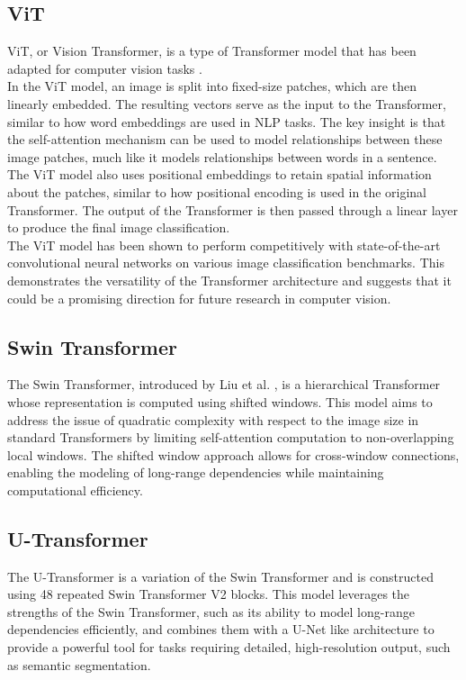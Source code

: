 \subsection{ViT}

ViT, or Vision Transformer, is a type of Transformer model that has been adapted for computer vision tasks \cite{dosovitskiy2021image}. \\

In the ViT model, an image is split into fixed-size patches, which are then linearly embedded. The resulting vectors serve as the input to the Transformer, similar to how word embeddings are used in NLP tasks. The key insight is that the self-attention mechanism can be used to model relationships between these image patches, much like it models relationships between words in a sentence.\\

The ViT model also uses positional embeddings to retain spatial information about the patches, similar to how positional encoding is used in the original Transformer. The output of the Transformer is then passed through a linear layer to produce the final image classification.\\

The ViT model has been shown to perform competitively with state-of-the-art convolutional neural networks on various image classification benchmarks. This demonstrates the versatility of the Transformer architecture and suggests that it could be a promising direction for future research in computer vision.\\

\subsection{Swin Transformer}

The Swin Transformer, introduced by Liu et al. \cite{liu2021swin}, is a hierarchical Transformer whose representation is computed using shifted windows. This model aims to address the issue of quadratic complexity with respect to the image size in standard Transformers by limiting self-attention computation to non-overlapping local windows. The shifted window approach allows for cross-window connections, enabling the modeling of long-range dependencies while maintaining computational efficiency.\\

\subsection{U-Transformer}

The U-Transformer is a variation of the Swin Transformer and is constructed using 48 repeated Swin Transformer V2 blocks. This model leverages the strengths of the Swin Transformer, such as its ability to model long-range dependencies efficiently, and combines them with a U-Net like architecture to provide a powerful tool for tasks requiring detailed, high-resolution output, such as semantic segmentation.\\
